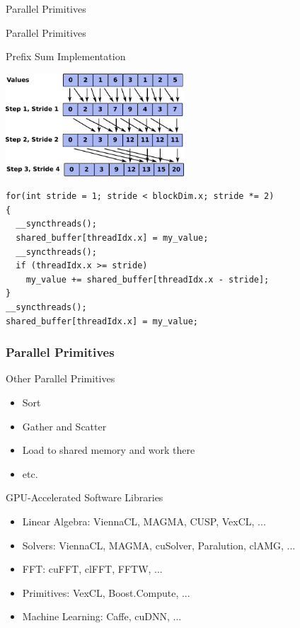 \begin{frame}[fragile]{Parallel Primitives}
\end{frame}




\begin{frame}[fragile]{Parallel Primitives}

 \begin{block}{Prefix Sum Implementation}
  \begin{center} \includegraphics[width=0.5\textwidth]{figures/prefix-sum} \end{center}
  \begin{lstlisting}
for(int stride = 1; stride < blockDim.x; stride *= 2)
{
  __syncthreads();
  shared_buffer[threadIdx.x] = my_value;
  __syncthreads();
  if (threadIdx.x >= stride)
    my_value += shared_buffer[threadIdx.x - stride];
}
__syncthreads();
shared_buffer[threadIdx.x] = my_value;
  \end{lstlisting}
 \end{block}
\end{frame}




\begin{frame}[fragile]
\frametitle{Parallel Primitives}

 \begin{block}{Other Parallel Primitives}
  \begin{itemize}
   \item Sort
   \item Gather and Scatter
   \item Load to shared memory and work there
   \item etc.
  \end{itemize}
 \end{block}

 \begin{block}{GPU-Accelerated Software Libraries}
  \begin{itemize}
   \item Linear Algebra: ViennaCL, MAGMA, CUSP, VexCL, ...
   \item Solvers: ViennaCL, MAGMA, cuSolver, Paralution, clAMG, ...
   \item FFT: cuFFT, clFFT, FFTW, ...
   \item Primitives: VexCL, Boost.Compute, ...
   \item Machine Learning: Caffe, cuDNN, ...
  \end{itemize}
 \end{block}

\end{frame}


